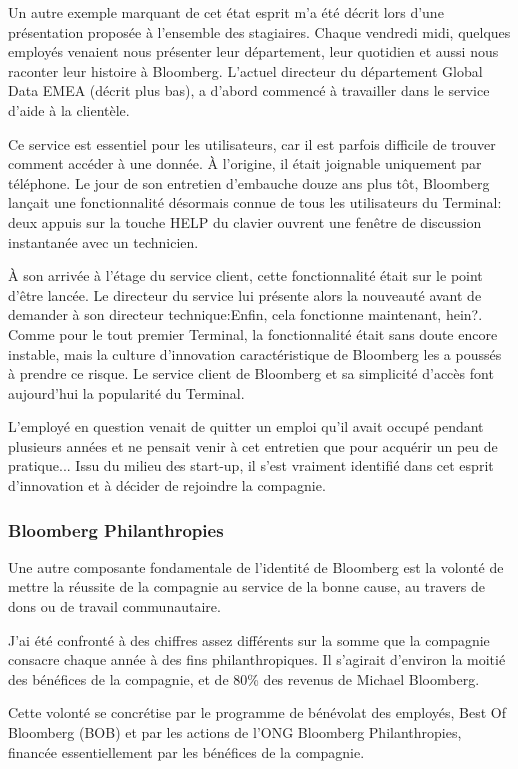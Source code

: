 \documentclass[11pt, oneside, titlepage, a4paper]{article}
\begin{document}
Un autre exemple marquant de cet état esprit m'a été décrit lors d'une présentation proposée à l'ensemble des stagiaires. Chaque vendredi midi, quelques employés venaient nous présenter leur département, leur quotidien et aussi nous raconter leur histoire à Bloomberg. L'actuel directeur du département Global Data EMEA (décrit plus bas), a d'abord commencé à travailler dans le service d'aide à la clientèle.

Ce service est essentiel pour les utilisateurs, car il est parfois difficile de trouver comment accéder à une donnée. À l'origine, il était joignable uniquement par téléphone. Le jour de son entretien d'embauche douze ans plus tôt, Bloomberg lançait une fonctionnalité désormais connue de tous les utilisateurs du Terminal: deux appuis sur la touche HELP du clavier ouvrent une fenêtre de discussion instantanée avec un technicien.

À son arrivée à l'étage du service client, cette fonctionnalité était sur le point d'être lancée. Le directeur du service lui présente alors la nouveauté avant de demander à son directeur technique:\og Enfin, cela fonctionne maintenant, hein?\fg{}. Comme pour le tout premier Terminal, la fonctionnalité était sans doute encore instable, mais la culture d'innovation caractéristique de Bloomberg les a poussés à prendre ce risque. Le service client de Bloomberg et sa simplicité d'accès font aujourd'hui la popularité du Terminal.

L'employé en question venait de quitter un emploi qu'il avait occupé pendant plusieurs années et ne pensait venir à cet entretien que pour acquérir un peu de pratique... Issu du milieu des start-up, il s'est vraiment identifié dans cet esprit d'innovation et à décider de rejoindre la compagnie.
		\subsubsection{Bloomberg Philanthropies}
Une autre composante fondamentale de l'identité de Bloomberg est la volonté de mettre la réussite de la compagnie au service de la bonne cause, au travers de dons ou de travail communautaire.

J'ai été confronté à des chiffres assez différents sur la somme que la compagnie consacre chaque année à des fins philanthropiques. Il s'agirait d'environ la moitié des bénéfices de la compagnie, et de 80\% des revenus de Michael Bloomberg.

Cette volonté se concrétise par le programme de bénévolat des employés, Best Of Bloomberg (BOB) et par les actions de l'ONG Bloomberg Philanthropies, financée essentiellement par les bénéfices de la compagnie.
\\
\end{document}
